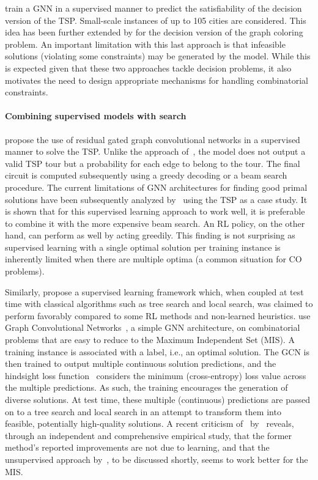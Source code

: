 \documentclass[twoside,11pt]{article}
\begin{document}
\citet{prates2019learning} train a GNN in a supervised manner to predict the satisfiability of the decision version of the TSP. Small-scale instances of up to 105 cities are considered. This idea has been further extended by \citet{lemos2019graph} for the decision version of the graph coloring problem. An important limitation with this last approach is that infeasible solutions (violating some constraints) may be generated by the model. While this is expected given that these two approaches tackle decision problems, it also motivates the need to design appropriate mechanisms for handling combinatorial constraints.

\paragraph{Combining supervised models with search}
\citet{joshi2019efficient} propose the use of residual gated graph convolutional networks \citep{bresson2017residual} in a supervised manner to solve the TSP. Unlike the approach of~\citet{Vinyals2015}, the model does not output a valid TSP tour but a probability for each edge to belong to the tour. The final circuit is computed subsequently using a greedy decoding or a beam search procedure. The current limitations of GNN architectures for finding good primal solutions have been subsequently analyzed by~\citet{Joshi2020} using the TSP as a case study. It is shown that for this supervised learning approach to work well, it is preferable to combine it with the more expensive beam search. An RL policy, on the other hand, can perform as well by acting greedily. This finding is not surprising as supervised learning with a single optimal solution per training instance is inherently limited when there are multiple optima (a common situation for CO problems).


Similarly, \citet{Li+2018a} propose a supervised learning framework which, when coupled at test time with classical algorithms such as tree search and local search, was claimed to perform favorably compared to some RL methods and non-learned heuristics. \citet{Li+2018a} use Graph Convolutional Networks~\citep[GCNs]{Kip+2017}, a simple GNN architecture, on combinatorial problems that are easy to reduce to the Maximum Independent Set (MIS). A training instance is associated with a label, i.e., an optimal solution. The GCN is then trained to output multiple continuous solution predictions, and the hindsight loss function~\citep{guzman2012multiple} considers the minimum (cross-entropy) loss value across the multiple predictions. As such, the training encourages the generation of diverse solutions. At test time, these multiple (continuous) predictions are passed on to a tree search and local search in an attempt to transform them into feasible, potentially high-quality solutions. A recent criticism of~\citep{Li+2018a} by~\citet{bother2022s} reveals, through an independent and comprehensive empirical study, that the former method's reported improvements are not due to learning, and that the unsupervised approach by~\cite{ahn2020learning}, to be discussed shortly, seems to work better for the MIS. 
\end{document}
